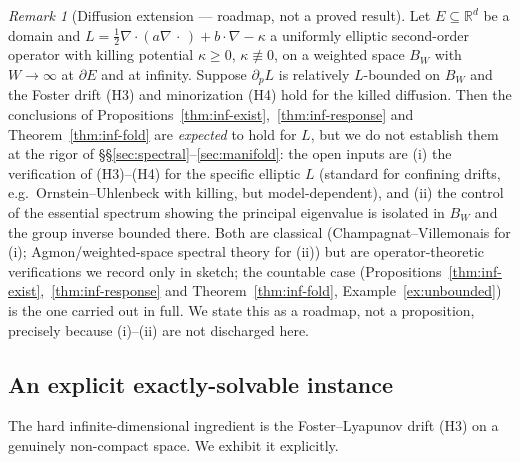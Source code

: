 \documentclass[11pt,reqno]{amsart}
\theoremstyle{plain}
\theoremstyle{definition}
\theoremstyle{remark}
\newtheorem{remark}[theorem]{Remark}
\newcommand{\R}{\mathbb{R}}
\begin{document}
\begin{remark}[Diffusion extension --- roadmap, not a proved result]\label{rem:inf-diffusion}
Let $E\subseteq\R^d$ be a domain and $L=\tfrac12\nabla\cdot(a\nabla\,\cdot\,)+b\cdot\nabla-\kappa$
a uniformly elliptic second-order operator with killing potential $\kappa\ge0$,
$\kappa\not\equiv0$, on a weighted space $B_W$ with $W\to\infty$ at $\partial E$ and at
infinity. Suppose $\partial_pL$ is relatively $L$-bounded on $B_W$ and the Foster drift
(H3) and minorization (H4) hold for the killed diffusion. Then the conclusions of
Propositions~\textup{\ref{thm:inf-exist}},~\textup{\ref{thm:inf-response}} and Theorem~\textup{\ref{thm:inf-fold}} are \emph{expected} to hold for $L$, but
we do not establish them at the rigor of \S\S\ref{sec:spectral}--\ref{sec:manifold}: the open inputs
are
(i) the verification of (H3)--(H4) for the specific elliptic $L$ (standard for
confining drifts, e.g.\ Ornstein--Uhlenbeck with killing, but model-dependent), and
(ii) the control of the essential spectrum showing the principal eigenvalue is isolated
in $B_W$ and the group inverse bounded there. Both are classical
(Champagnat--Villemonais for (i); Agmon/weighted-space spectral theory for (ii)) but are
operator-theoretic verifications we record only in sketch; the countable case
(Propositions~\ref{thm:inf-exist},~\ref{thm:inf-response} and Theorem~\ref{thm:inf-fold}, Example~\ref{ex:unbounded}) is the
one carried out in full. We state this as a roadmap, not a proposition, precisely because (i)--(ii)
are not discharged here.
\end{remark}

\subsection{An explicit exactly-solvable instance}
The hard infinite-dimensional ingredient is the Foster--Lyapunov drift (H3) on a
genuinely non-compact space. We exhibit it explicitly.
\end{document}
